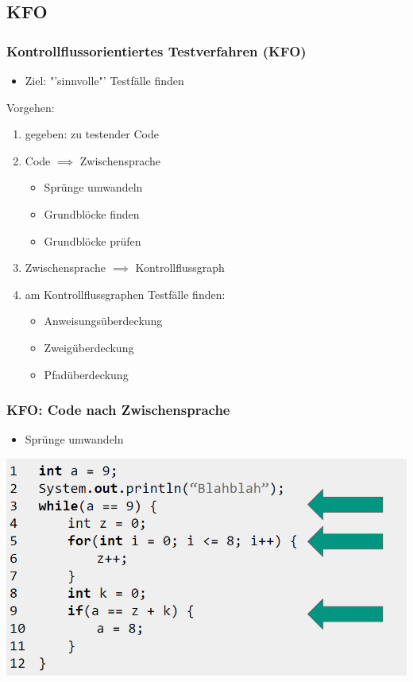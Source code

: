 \documentclass[18pt]{beamer}
\begin{document}
	\subsection{KFO}
	\begin{frame}
		\frametitle{Kontrollflussorientiertes Testverfahren (KFO)}
		\begin{itemize}
			\item Ziel: "'sinnvolle"' Testfälle finden
		\end{itemize}
		Vorgehen:
		\begin{enumerate}
			\item gegeben: zu testender Code \pause
			\item Code $\implies$ Zwischensprache
			\begin{itemize}
				\item Sprünge umwandeln
				\item Grundblöcke finden
				\item Grundblöcke prüfen
			\end{itemize}
			\pause
			\item Zwischensprache $\implies$ Kontrollflussgraph \pause
			\item am Kontrollflussgraphen Testfälle finden: \pause
			\begin{itemize}
				\item Anweisungsüberdeckung
				\item Zweigüberdeckung 
				\item Pfadüberdeckung
			\end{itemize}
		\end{enumerate}
	\end{frame}

	\begin{frame}
		\frametitle{KFO: Code nach Zwischensprache}
		\begin{itemize}
			\item Sprünge umwandeln
		\end{itemize}
		\centering \includegraphics[scale=0.34]{./pics/tut5/code.png}
	\end{frame}
\end{document}

